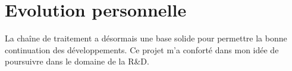 \section{Evolution personnelle}

La chaîne de traitement a désormais une base solide pour permettre la bonne continuation des développements. Ce projet m’a conforté dans mon idée de poursuivre dans le domaine de la R\&D. \cite{neapolitan_learning_2007}
